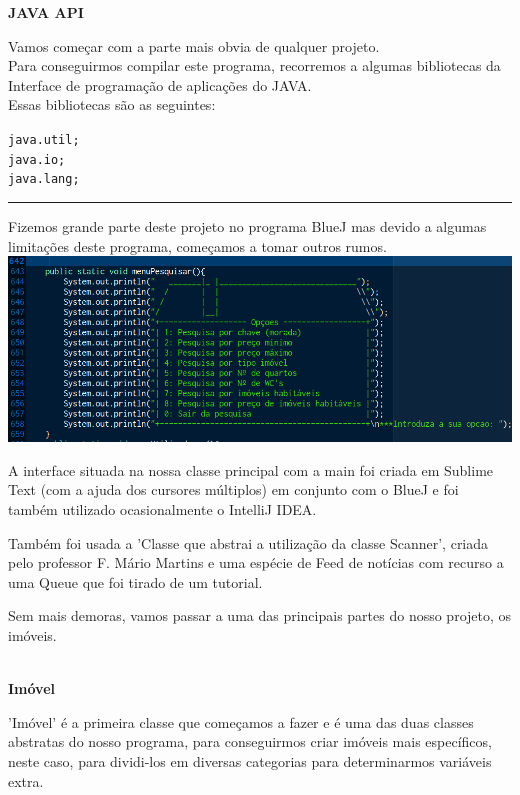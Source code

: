 \documentclass[12pt]{article}
\newenvironment{code}                    
{\textbf{
} \hspace{1cm} \hrulefill \\ 
\smallskip 
\begin{center}
\begin{minipage}{0.9\textwidth} 
\begin{alltt}\small}
{\end{alltt}
\end{minipage}
\end{center}
\hrule\smallskip
}
\begin{document}
\textbf{JAVA API}
\newline

Vamos começar com a parte mais obvia de qualquer projeto.\\
Para conseguirmos compilar este programa, recorremos a algumas bibliotecas da Interface de programação de aplicações do JAVA.\\

Essas bibliotecas são as seguintes:
\newline
\begin{code}
java.util;
java.io;
java.lang;
\end{code}

Fizemos grande parte deste projeto no programa BlueJ mas devido a algumas limitações deste programa, começamos a tomar outros rumos.
\newline
\newline
\includegraphics[scale=0.4]{002.png}	 
\newline
\newline

A interface situada na nossa classe principal com a main foi criada em Sublime Text (com a ajuda dos cursores múltiplos) em conjunto com o BlueJ e foi também utilizado ocasionalmente o IntelliJ IDEA.
\newline

Também foi usada a 'Classe que abstrai a utilização da classe Scanner', criada pelo professor F. Mário Martins e uma espécie de Feed de notícias com recurso a uma Queue que foi tirado de um tutorial.
\newline

Sem mais demoras, vamos passar a uma das principais partes do nosso projeto, os imóveis.

\pagebreak

\textbf{\\Imóvel}
\newline

'Imóvel' é a primeira classe que começamos a fazer e é uma das duas classes abstratas do nosso programa, para conseguirmos criar imóveis mais específicos, neste caso, para dividi-los em diversas categorias para determinarmos variáveis extra. 
\newline
\end{document}
